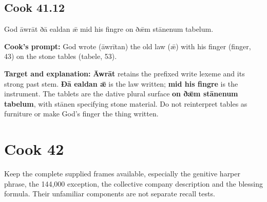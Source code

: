 \par\begin{minipage}{\linewidth}\raggedright
\subsection*{Cook 41.12}

God āwrāt ðā ealdan ǣ mid his fingre on ðǣm stānenum tabelum.

\textbf{Cook's prompt:} God wrote (āwrītan) the old law (ǣ) with his finger (finger, 43) on the stone tables (tabele, 53).

\textbf{Target and explanation:} \textbf{Āwrāt} retains the prefixed write lexeme and its strong past stem. \textbf{Ðā ealdan ǣ} is the law written; \textbf{mid his fingre} is the instrument. The tablets are the dative plural surface \textbf{on ðǣm stānenum tabelum}, with stānen specifying stone material. Do not reinterpret tables as furniture or make God's finger the thing written.

\end{minipage}\par\addvspace{4pt}

\clearpage
\section*{Cook 42}

Keep the complete supplied frames available, especially the genitive harper phrase, the 144,000 exception, the collective company description and the blessing formula. Their unfamiliar components are not separate recall tests.

